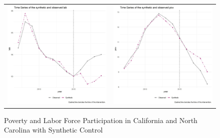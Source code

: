 \documentclass{article}
\begin{document}
\begin{figure}
\begin{center}
\caption{Poverty and Labor Force Participation in California and North Carolina with Synthetic Control}
\label{fig:series}{}
\begin{tabular}{cc}
 \includegraphics[width=80mm]{ca_lab_trend} &   \includegraphics[width=80mm]{ca_pov_trend} \\

\end{tabular}
\end{center}
\end{figure}
\end{document}
